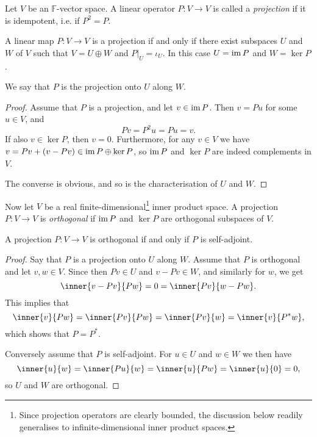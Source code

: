 \documentclass[article, a4paper, 11pt, oneside]{memoir}
\numberwithin{equation}{chapter}
\newcommand{\field}{\mathbb{F}}
\begin{document}
Let $V$ be an $\field$-vector space. A linear operator $P \colon V \to V$ is called a \emph{projection} if it is idempotent, i.e. if $P^2 = P$.

\begin{proposition}
    A linear map $P \colon V \to V$ is a projection if and only if there exist subspaces $U$ and $W$ of $V$ such that $V = U \oplus W$ and $P|_U = \iota_U$. In this case $U = \operatorname{im} P$ and $W = \ker P$.
\end{proposition}
%
We say that $P$ is the projection onto $U$ along $W$.

\begin{proof}
    Assume that $P$ is a projection, and let $v \in \operatorname{im} P$. Then $v = Pu$ for some $u \in V$, and
    \begin{equation*}
        Pv
            = P^2 u
            = Pu
            = v.
    \end{equation*}
    If also $v \in \ker P$, then $v = 0$. Furthermore, for any $v \in V$ we have $v = Pv + (v - Pv) \in \operatorname{im} P \oplus \ker P$, so $\operatorname{im} P$ and $\ker P$ are indeed complements in $V$.

    The converse is obvious, and so is the characterisation of $U$ and $W$.
\end{proof}

Now let $V$ be a real finite-dimensional\footnote{Since projection operators are clearly bounded, the discussion below readily generalises to infinite-dimensional inner product spaces.} inner product space. A projection $P \colon V \to V$ is \emph{orthogonal} if $\operatorname{im} P$ and $\ker P$ are orthogonal subspaces of $V$.

\begin{proposition}
    A projection $P \colon V \to V$ is orthogonal if and only if $P$ is self-adjoint.
\end{proposition}

\begin{proof}
    Say that $P$ is a projection onto $U$ along $W$. Assume that $P$ is orthogonal and let $v,w \in V$. Since then $Pv \in U$ and $v - Pv \in W$, and similarly for $w$, we get
    \begin{equation*}
        \inner{v - Pv}{Pw}
            = 0
            = \inner{Pv}{w - Pw}.
    \end{equation*}
    This implies that
    \begin{equation*}
        \inner{v}{Pw}
            = \inner{Pv}{Pw}
            = \inner{Pv}{w}
            = \inner{v}{P^* w},
    \end{equation*}
    which shows that $P = P^*$.

    Conversely assume that $P$ is self-adjoint. For $u \in U$ and $w \in W$ we then have
    \begin{equation*}
        \inner{u}{w}
            = \inner{Pu}{w}
            = \inner{u}{Pw}
            = \inner{u}{0}
            = 0,
    \end{equation*}
    so $U$ and $W$ are orthogonal.
\end{proof}
\end{document}
